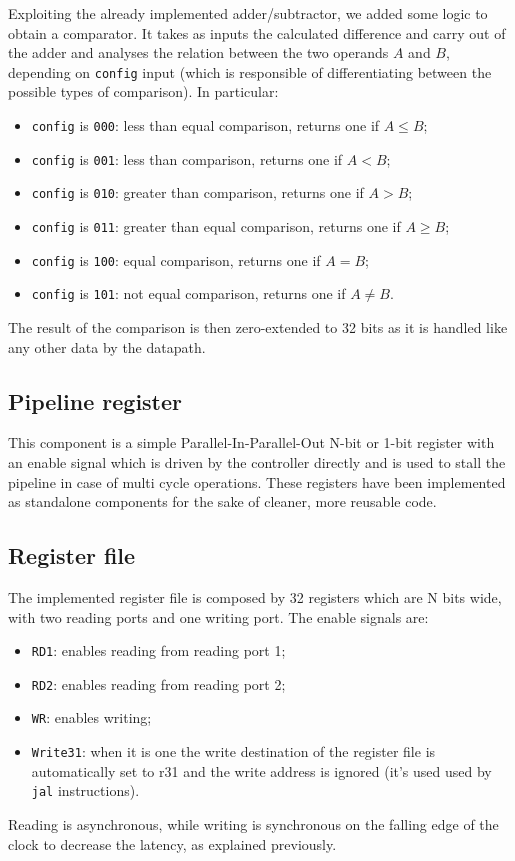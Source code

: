 Exploiting the already implemented adder/subtractor, we added some logic to obtain a comparator. 
It takes as inputs the calculated difference and carry out of the adder and analyses the relation between the two operands $A$ and $B$, depending on \texttt{config} input (which is responsible of differentiating between the possible types of comparison). 
In particular:
\begin{itemize}
    \item \texttt{config} is \texttt{000}:  less than equal comparison, returns one if $A \leq B$;
    \item \texttt{config} is \texttt{001}: less than comparison, returns one if $A<B$;
    \item \texttt{config} is \texttt{010}: greater than comparison, returns one if $A>B$;
    \item \texttt{config} is \texttt{011}: greater than equal comparison, returns one if $A \geq B$;
    \item \texttt{config} is \texttt{100}: equal comparison, returns one if $A=B$;
    \item \texttt{config} is \texttt{101}: not equal comparison, returns one if $A\neq B$.
\end{itemize}

The result of the comparison is then zero-extended to 32 bits as it is handled like any other data by the datapath.

\subsection{Pipeline register}

This component is a simple Parallel-In-Parallel-Out N-bit or 1-bit register with an enable signal which is driven by the controller directly and is used to stall the pipeline in case of multi cycle operations.
These registers have been implemented as standalone components for the sake of cleaner, more reusable code.

\subsection{Register file}

The implemented register file is composed by 32 registers which are N bits wide, with two reading ports and one writing port. 
The enable signals are:
\begin{itemize}
    \item \texttt{RD1}: enables reading from reading port 1;
    \item \texttt{RD2}: enables reading from reading port 2;
    \item \texttt{WR}: enables writing;
    \item  \texttt{Write31}: when it is one the write destination of the register file is automatically set to r31 and the write address is ignored (it's used used by \texttt{jal} instructions).
\end{itemize}
Reading is asynchronous, while writing is synchronous on the falling edge of the clock to decrease the latency, as explained previously.

